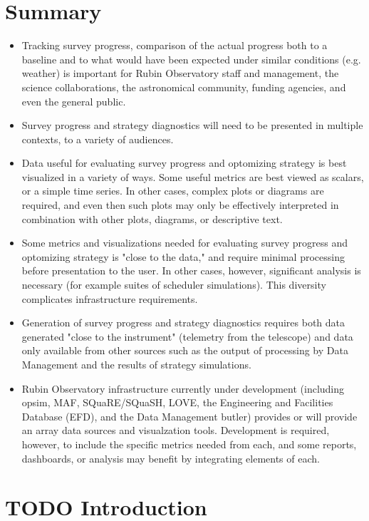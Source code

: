 
\section{Summary}
\label{sec:org887ba73}
\begin{itemize}
\item Tracking survey progress, comparison of the actual progress both to a baseline and to what would have been expected under similar conditions (e.g. weather) is important for Rubin Observatory staff and management, the science collaborations, the astronomical community, funding agencies, and even the general public.
\item Survey progress and strategy diagnostics will need to be presented in multiple contexts, to a variety of audiences.
\item Data useful for evaluating survey progress and optomizing strategy is best visualized in a variety of ways. Some useful metrics are best viewed as scalars, or a simple time series. In other cases, complex plots or diagrams are required, and even then such plots may only be effectively interpreted in combination with other plots, diagrams, or descriptive text.
\item Some metrics and visualizations needed for evaluating survey progress and optomizing strategy is "close to the data," and require minimal processing before presentation to the user. In other cases, however, significant analysis is necessary (for example suites of scheduler simulations). This diversity complicates infrastructure requirements.
\item Generation of survey progress and strategy diagnostics requires both data generated "close to the instrument" (telemetry from the telescope) and data only available from other sources such as the output of processing by Data Management and the results of strategy simulations.
\item Rubin Observatory infrastructure currently under development (including opsim, MAF, SQuaRE/SQuaSH, LOVE, the Engineering and Facilities Database (EFD), and the Data Management butler) provides or will provide an array data sources and visualzation tools. Development is required, however, to include the specific metrics needed from each, and some reports, dashboards, or analysis may benefit by integrating elements of each.
\end{itemize}
\section{{\bfseries\sffamily TODO} Introduction}
\label{sec:org36f5216}
